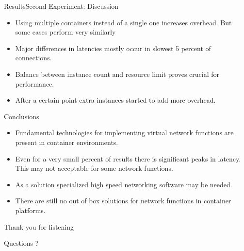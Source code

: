 \documentclass{beamer}
\begin{document}
\begin{frame}{Results}{Second Experiment: Discussion}
 \begin{itemize}
  \item Using multiple containers instead of a single one increases overhead. But
  some cases perform very similarly
  \item Major differences in latencies mostly occur in slowest 5 percent of connections.
  \item Balance between instance count and resource limit proves crucial for performance.
  \item After a certain point extra instances started to add more overhead.
 \end{itemize}
\end{frame}

\begin{frame}{Conclusions}
 \begin{itemize}
  \item Fundamental technologies for implementing virtual network functions are
  present in container environments.
  \item Even for a very small percent of results there is significant peaks in latency. This
  may not acceptable for some network functions.
  \item As a solution specialized high speed networking software may be needed.
  \item There are still no out of box solutions for network functions in container platforms.
 \end{itemize}

\end{frame}


\begin{frame}
 \begin{center}
 \Huge Thank you for listening
 \end{center}
\end{frame}

\begin{frame}
 \begin{center}
 \Huge Questions ?
 \end{center}
\end{frame}
\end{document}
